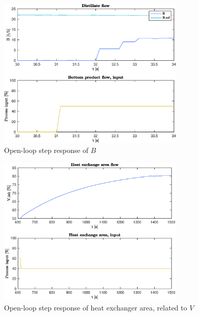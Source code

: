 \documentclass[12pt]{article}
\begin{document}
\begin{figure}
\centering
\includegraphics[width=0.8\textwidth]{../Systemanalyse/Log_Data_to_Matlab/Figurer/Stegeksperimenter/FC1019.eps}
\caption{Open-loop step response of $B$}
\label{fig:ol_step_FC1019}
\end{figure}

\begin{figure}
\centering
\includegraphics[width=0.8\textwidth]{../Systemanalyse/Log_Data_to_Matlab/Figurer/Stegeksperimenter/LC1028.eps}
\caption{Open-loop step response of heat exchanger area, related to $V$}
\label{fig:ol_step_LC1028}
\end{figure}
\end{document}

